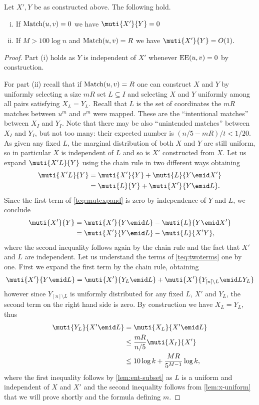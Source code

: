 \begin{lemma}
\label{lem:y-uniform}
Let $X',Y$ be as constructed above. The following hold.
\begin{enumerate}[(i)]
\item If $\operatorname{Match}(u,v)=0$ we have
$\muti{X'}{Y} = 0$
\item If $M>100\log n$ and $\operatorname{Match}(u,v)=R$ we have
$\muti{X'}{Y} = O(1).$
\end{enumerate}
\end{lemma}
\begin{proof}
Part (i) holds as $Y$ is independent of $X'$
whenever $\operatorname{EE}(u,v)=0$ by construction.

For part (ii) recall that if $\operatorname{Match}(u,v)=R$ one can construct
$X$ and $Y$ by uniformly selecting a size $mR$ set $L\subseteq
I$ and selecting $X$ and $Y$ uniformly among all pairs
satisfying $X_L=Y_L$. Recall that $L$ is the set of coordinates
the $mR$ matches between $u^m$ and $v^m$ were mapped. These are
the ``intentional matches'' between $X_I$ and $Y_I$. Note that
there may be also ``unintended matches'' between $X_I$ and
$Y_I$, but not too many: their expected number is
$(n/5-mR)/t<1/20$. As given any fixed $L$, the marginal
distribution of both $X$ and $Y$ are still uniform, so in
particular $X$ is independent of $L$ and so is $X'$ constructed
from $X$. Let us expand $\muti{X'L}{Y}$ using the chain rule in
two different ways obtaining
\begin{align}
\muti{X'L}{Y}
    &= \muti{X'}{Y} + \muti{L}{Y\emid X'}\nonumber\\
    &= \muti{L}{Y} + \muti{X'}{Y\emid L}\label{teq:mutexpand}.
\end{align}
Since the first term of \eqref{teq:mutexpand} is zero 
by independence of $Y$ and $L$, we conclude
\begin{align}
\muti{X'}{Y}
    &= \muti{X'}{Y\emid L} - \muti{L}{Y\emid X'}\nonumber\\
    &= \muti{X'}{Y\emid L} - \muti{L}{X'Y}\label{teq:twoterms},
\end{align}
where the second inequality follows again by the chain rule 
and the fact that $X'$ and $L$ are independent.
Let us understand the terms of \eqref{teq:twoterms} one by one.
First we  expand the first term by the chain rule, obtaining
\begin{align*}
\muti{X'}{Y\emid L} = \muti{X'}{Y_L\emid L} + \muti{X'}{Y_{[n]\setminus L}\emid LY_L}
\end{align*}
however since $Y_{[n]\setminus L}$ is uniformly distributed for any fixed
$L$, $X'$ and $Y_L$, the second term on the right hand side is zero. 
By construction we have $X_L=Y_L$, thus
\begin{align*}
\muti{Y_L}{X'\emid L} 
    &= \muti{X_L}{X'\emid L}\\
    &\le \frac{mR}{n/5}\muti{X_I}{X'}\\
    &\le 10\log k + \frac{MR}{5^{M-1}}\log k,
\end{align*}
where the first inequality follows by \autoref{lem:ent-subset}
as $L$ is a uniform and independent of $X$ and $X'$ and the
second inequality follows from \autoref{lem:x-uniform} that we
will prove shortly and the formula defining $m$.


\end{proof}
